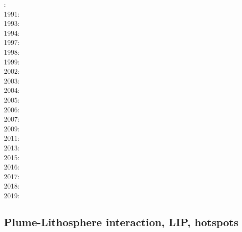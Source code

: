 {\scriptsize
{}: \cite{hovo77}\\
1991: \cite{kell91}\\
1993: \cite{keki93}\\
1994: \cite{nasf94}\cite{fari94}\cite{leka94b}\cite{hayu94}\\
1997: \cite{vank97}\cite{keki97}\cite{laym97}\\
1998: \cite{thta98}\cite{stoc98}\\
1999: \cite{lays99}\\
2002: \cite{falt02}\cite{dagl02}\cite{nitg02}\cite{tagh02}\\
2003: \cite{safa03}\\
2004: \cite{goch04}\cite{scmo04}\\
2005: \cite{tagu05}\cite{bung05}\cite{zhon05}\\
2006: \cite{isst06}\cite{liva06a}\cite{liva06b}\cite{zhon06}\cite{mita06}\cite{nokm06}\cite{qufo06}
      \cite{keso06}\\
2007: \cite{yumh07}\cite{ogaw07}\\
2009: \cite{vavl09}\cite{bogj09}\cite{faho09}\cite{scbs09b}\\
2011: \cite{toyu11}\cite{talz11}\cite{burk11}\cite{memm11}\cite{dalt11}\cite{tree11}\\
2013: \cite{dagm13}\cite{madd13}\cite{ande13}\cite{vadv13}\\
2015: \cite{daso15}\cite{hafg15}\\
2016: \cite{kili16}\cite{dannbergphd}\\
2017: \cite{zhli17}\cite{moyu17}\cite{lizh17}\\
2018: \cite{dacc18}\cite{trev18}\\
2019: \cite{argc19}
}

\subsection{Plume-Lithosphere interaction, LIP, hotspots}


